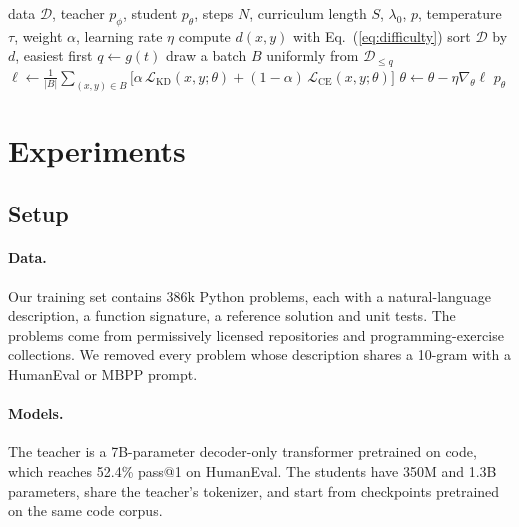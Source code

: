 \documentclass{article} %
\begin{document}
\begin{algorithm}[t]
\caption{Curriculum-Paced Distillation (CPD)}
\label{alg:cpd}
\begin{algorithmic}[1]
\REQUIRE data $\mathcal{D}$, teacher $p_\phi$, student $p_\theta$, steps $N$, curriculum length $S$, $\lambda_0$, $p$, temperature $\tau$, weight $\alpha$, learning rate $\eta$
\STATE compute $d(x, y)$ with Eq.~(\ref{eq:difficulty})
\ENDFOR
\STATE sort $\mathcal{D}$ by $d$, easiest first
\STATE $q \leftarrow g(t)$ 
\STATE draw a batch $B$ uniformly from $\mathcal{D}_{\le q}$
\STATE $\ell \leftarrow \frac{1}{|B|} \sum_{(x, y) \in B} \bigl[ \alpha\, \mathcal{L}_{\mathrm{KD}}(x, y; \theta) + (1 - \alpha)\, \mathcal{L}_{\mathrm{CE}}(x, y; \theta) \bigr]$ 
\STATE $\theta \leftarrow \theta - \eta \nabla_\theta \ell$ 
\ENDFOR
\RETURN $p_\theta$
\end{algorithmic}
\end{algorithm}

\section{Experiments}
\label{sec:experiments}

\subsection{Setup}

\paragraph{Data.}
Our training set contains 386k Python problems, each with a natural-language description, a function signature, a reference solution and unit tests.
The problems come from permissively licensed repositories and programming-exercise collections.
We removed every problem whose description shares a 10-gram with a HumanEval or MBPP prompt.

\paragraph{Models.}
The teacher is a 7B-parameter decoder-only transformer \citep{vaswani2017attention} pretrained on code, which reaches 52.4\% pass@1 on HumanEval.
The students have 350M and 1.3B parameters, share the teacher's tokenizer, and start from checkpoints pretrained on the same code corpus.
\end{document}
